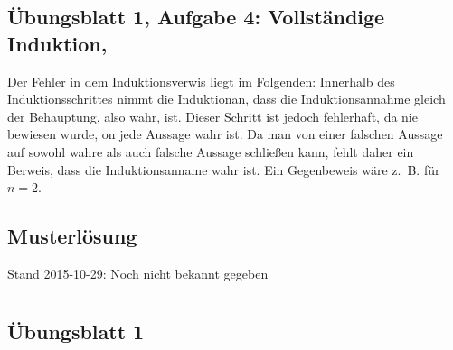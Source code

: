 \documentclass[12pt,a4paper]{report}
\begin{document}
\newpage
\section{Übungsblatt 1, Aufgabe 4: Vollständige Induktion, \GruppeA}
Der Fehler in dem Induktionsverwis liegt im Folgenden: Innerhalb des Induktionsschrittes nimmt die Induktionan, dass die Induktionsannahme gleich der Behauptung, also wahr, ist. Dieser Schritt ist jedoch fehlerhaft, da nie bewiesen wurde, on jede Aussage wahr ist. Da man von einer falschen Aussage auf sowohl wahre als auch falsche Aussage schließen kann, fehlt daher ein Berweis, dass die Induktionsanname wahr ist. Ein Gegenbeweis wäre z.~B. für $n=2$.

\newpage
\section{Musterlösung}

Stand 2015-10-29: Noch nicht bekannt gegeben

\appendices
	\chapter{}
	\section{Übungsblatt 1}\label{uebungsblatt1}
	
\end{document}
